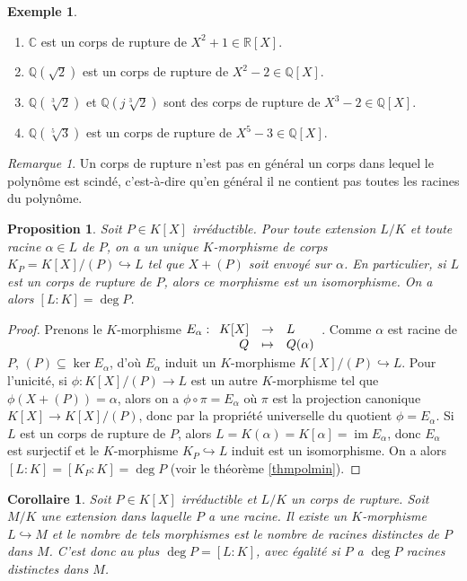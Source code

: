 \documentclass{article}
\newcommand{\Q}{\mathbb{Q}}
\newcommand{\R}{\mathbb{R}}
\newcommand{\C}{\mathbb{C}}
\DeclareMathOperator{\im}{im}
\newcommand{\applic}[4]{\begin{array}[t]{rcl}
#1 & \to & #2 \\
#3 & \mapsto & #4
\end{array}}
\renewcommand{\subset}{\subseteq}
\theoremstyle{plain}
\newtheorem{proposition}[theorem]{Proposition}
\newtheorem{corollary}[theorem]{Corollaire}
\theoremstyle{definition}
\newtheorem{example}[theorem]{Exemple}
\theoremstyle{remark}
\newtheorem*{remark}{Remarque}
\begin{document}
\begin{example} \leavevmode
    \begin{enumerate}
        \item $\C$ est un corps de rupture de $X^2 + 1 \in \R[X]$.
        \item $\Q(\sqrt{2})$ est un corps de rupture de $X^2 - 2 \in \Q[X]$.
        \item $\Q(\sqrt[3]{2})$ et $\Q(j\sqrt[3]{2})$ sont des corps de rupture de $X^3 - 2 \in \Q[X]$.
        \item $\Q(\sqrt[5]{3})$ est un corps de rupture de $X^5 - 3 \in \Q[X]$.
    \end{enumerate}
\end{example}

\begin{remark}
    Un corps de rupture n'est pas en général un corps dans lequel le polynôme est scindé, c'est-à-dire qu'en général il ne contient pas \og toutes \fg les racines du polynôme.
\end{remark}

\begin{proposition}
    Soit $P \in K[X]$ irréductible. Pour toute extension $L/K$ et toute racine $\alpha \in L$ de $P$, on a un unique $K$-morphisme de corps $K_P = K[X]/(P) \hookrightarrow L$ tel que $X + (P)$ soit envoyé sur $\alpha$. En particulier, si $L$ est un corps de rupture de $P$, alors ce morphisme est un isomorphisme. On a alors $[L : K] = \deg P$.
\end{proposition}

\begin{proof}
    Prenons le $K$-morphisme $E_\alpha : \applic{K[X]}{L}{Q}{Q(\alpha)}$. Comme $\alpha$ est racine de $P$, $(P) \subset \ker E_\alpha$, d'où $E_\alpha$ induit un $K$-morphisme $K[X]/(P) \hookrightarrow L$. Pour l'unicité, si $\phi : K[X]/(P) \to L$ est un autre $K$-morphisme tel que $\phi(X+(P)) = \alpha$, alors on a $\phi \circ \pi = E_\alpha$ où $\pi$ est la projection canonique $K[X] \to K[X]/(P)$, donc par la propriété universelle du quotient $\phi = E_\alpha$. Si $L$ est un corps de rupture de $P$, alors $L = K(\alpha) = K[\alpha] = \im E_\alpha$, donc $E_\alpha$ est surjectif et le $K$-morphisme $K_P \hookrightarrow L$ induit est un isomorphisme. On a alors $[L : K] = [K_P : K] = \deg P$ (voir le théorème \ref{thmpolmin}).
\end{proof}

\begin{corollary}
    Soit $P \in K[X]$ irréductible et $L/K$ un corps de rupture. Soit $M/K$ une extension dans laquelle $P$ a une racine. Il existe un $K$-morphisme $L \hookrightarrow M$ et le nombre de tels morphismes est le nombre de racines distinctes de $P$ dans $M$. C'est donc au plus $\deg P = [L : K]$, avec égalité si $P$ a $\deg P$ racines distinctes dans $M$.
\end{corollary}
\end{document}
